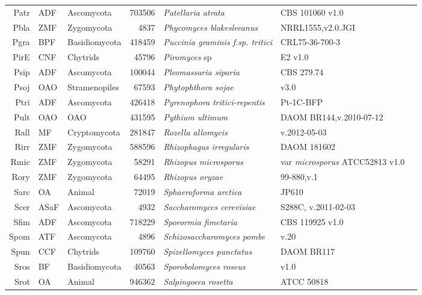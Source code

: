 {{{\begin{longtable}{rllrlll}
  Patr & ADF & Ascomycota & 703506 & \emph{Patellaria atrata} & CBS 101060 v1.0 & \cite{Patr} \\ 
  Pbla & ZMF & Zygomycota & 4837 & \emph{Phycomyces blakesleeanus} & NRRL1555,v2.0.JGI & \cite{Pbla} \\ 
  Pgra & BPF & Basidiomycota & 418459 & \emph{Puccinia graminis f.sp. tritici} & CRL75-36-700-3 & \cite{Stajich2012FungiDB} \\ 
  PirE & CNF & Chytrids & 45796 & \emph{Piromyces} sp & E2 v1.0 & \cite{PirE} \\ 
  Psip & ADF & Ascomycota & 100044 & \emph{Pleomassaria siparia} & CBS 279.74 & \cite{Psip} \\ 
  Psoj & OAO & Stramenopiles & 67593 & \emph{Phytophthora sojae} & v3.0 & \cite{Tyler2006} \\ 
  Ptri & ADF & Ascomycota & 426418 & \emph{Pyrenophora tritici-repentis} & Pt-1C-BFP & \cite{Manning2013} \\ 
  Pult & OAO & OAO & 431595 & \emph{Pythium ultimum} & DAOM BR144,v.2010-07-12 & \cite{Levesque2010} \\ 
  Rall & MF & Cryptomycota & 281847 & \emph{Rozella allomycis} & v.2012-05-03 & \cite{James2013} \\ 
  Rirr & ZMF & Zygomycota & 588596 & \emph{Rhizophagus irregularis} & DAOM 181602 & \cite{Tisserant2013} \\ 
  Rmic & ZMF & Zygomycota & 58291 & \emph{Rhizopus microsporus} & var \emph{microsporus} ATCC52813 v1.0 & \cite{Rmic} \\ 
  Rory & ZMF & Zygomycota & 64495 & \emph{Rhizopus oryzae} & 99-880,v.1 & \cite{Ma2009} \\ 
  Sarc & OA & Animal & 72019 & \emph{Sphaeroforma arctica } & JP610 & \cite{RuizTrillo2007} \\ 
  Scer & ASaF & Ascomycota & 4932 & \emph{Saccharomyces cerevisiae} & S288C, v.2011-02-03 & \cite{Scer} \\ 
  Sfim & ADF & Ascomycota & 718229 & \emph{Sporormia fimetaria} & CBS 119925 v1.0 & \cite{Sfim} \\ 
  Spom & ATF & Ascomycota & 4896 & \emph{Schizosaccharomyces pombe} & v.20 & \cite{Wood2002} \\ 
  Spun & CCF & Chytrids & 109760 & \emph{Spizellomyces punctatus} & DAOM BR117 & \cite{RuizTrillo2007} \\ 
  Sros & BF & Basidiomycota & 40563 & \emph{Sporobolomyces roseus} & v1.0 & \cite{Sros} \\ 
  Srot & OA & Animal & 946362 & \emph{Salpingoeca rosetta} & ATCC 50818 & \cite{RuizTrillo2007} \\ 

\end{longtable}}}}
